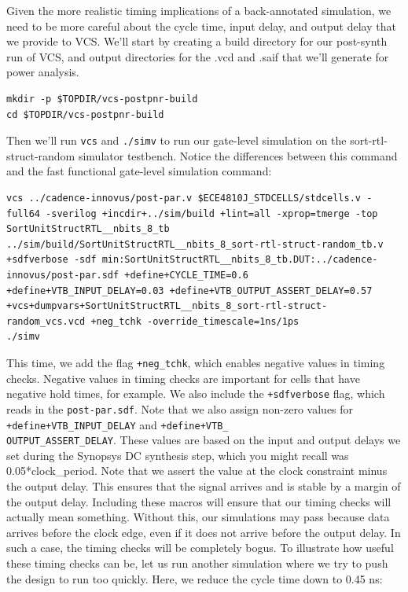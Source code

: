 \documentclass[a4paper,12pt,twoside]{article}
\begin{document}
Given the more realistic timing implications of a back-annotated simulation, we need to be more careful about the cycle time, input delay, and output delay that we provide to VCS. We’ll start by creating a build directory for our post-synth run of VCS, and output directories for the .vcd and .saif that we’ll generate for power analysis.
\begin{verbatim}
mkdir -p $TOPDIR/vcs-postpnr-build
cd $TOPDIR/vcs-postpnr-build
\end{verbatim}
Then we’ll run \texttt{vcs} and \texttt{./simv} to run our gate-level simulation on the sort-rtl-struct-random simulator testbench. Notice the differences between this command and the fast functional gate-level simulation command:
\begin{verbatim}
vcs ../cadence-innovus/post-par.v $ECE4810J_STDCELLS/stdcells.v -full64 -sverilog +incdir+../sim/build +lint=all -xprop=tmerge -top SortUnitStructRTL__nbits_8_tb ../sim/build/SortUnitStructRTL__nbits_8_sort-rtl-struct-random_tb.v +sdfverbose -sdf min:SortUnitStructRTL__nbits_8_tb.DUT:../cadence-innovus/post-par.sdf +define+CYCLE_TIME=0.6 +define+VTB_INPUT_DELAY=0.03 +define+VTB_OUTPUT_ASSERT_DELAY=0.57 +vcs+dumpvars+SortUnitStructRTL__nbits_8_sort-rtl-struct-random_vcs.vcd +neg_tchk -override_timescale=1ns/1ps
./simv
\end{verbatim}
This time, we add the flag \texttt{+neg\_tchk}, which enables negative values in timing checks. Negative values in timing checks are important for cells that have negative hold times, for example. We also include the \texttt{+sdfverbose} flag, which reads in the \texttt{post-par.sdf}. Note that we also assign non-zero values for \texttt{+define+VTB\_INPUT\_DELAY} and \texttt{+define+VTB\_\\
OUTPUT\_ASSERT\_DELAY}. These values are based on the input and output delays we set during the Synopsys DC synthesis step, which you might recall was 0.05*clock\_period. Note that we assert the value at the clock constraint minus the output delay. This ensures that the signal arrives and is stable by a margin of the output delay. Including these macros will ensure that our timing checks will actually mean something. Without this, our simulations may pass because data arrives before the clock edge, even if it does not arrive before the output delay. In such a case, the timing checks will be completely bogus. To illustrate how useful these timing checks can be, let us run another simulation where we try to push the design to run too quickly. Here, we reduce the cycle time down to 0.45 ns:
\end{document}
